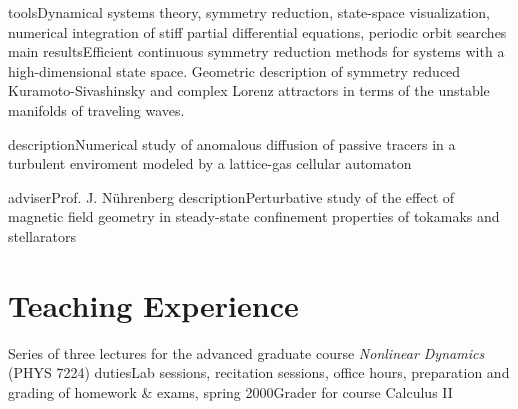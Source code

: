 \documentclass[11pt,a4paper,final]{moderncv}
\begin{document}
		{tools}{Dynamical systems theory, symmetry reduction, state-space visualization, numerical integration of stiff partial differential equations, periodic orbit searches}
		{main results}{Efficient continuous symmetry reduction methods for systems with a high-dimensional state space.
				Geometric description of symmetry reduced Kuramoto-Sivashinsky and complex Lorenz attractors
				in terms of the unstable manifolds of traveling waves.
				}

{description}{Numerical study of anomalous diffusion of passive tracers in a turbulent enviroment modeled by
	      a lattice-gas cellular automaton}

{adviser}{Prof. J. N\"{u}hrenberg}
{description}{Perturbative study of the effect of magnetic field geometry in steady-state confinement
	      properties of tokamaks and stellarators}

\section{Teaching Experience}
{Series of three lectures for the advanced graduate course {\em Nonlinear Dynamics} (PHYS 7224)}
	     {duties}{Lab sessions, recitation sessions, office hours, preparation and grading of homework \& exams\sep}{}{}
	      {spring 2000}{Grader for course Calculus II}{}{}
\end{document}
